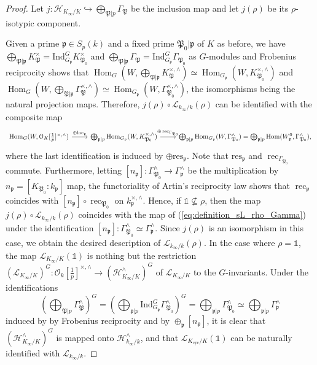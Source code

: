 \documentclass[12pt]{amsart}
\newcommand\cH{\mathcal{H}}
\newcommand\cO{\mathcal{O}}
\newcommand\gp{\mathfrak{p}}
\newcommand\gP{\mathfrak{P}}
\newcommand\sL{\mathscr{L}}
\newcommand{\loc}{\mathrm{loc}}
\newcommand{\Ind}{\mathrm{Ind}}
\newcommand{\res}{\mathrm{res}}
\DeclareMathOperator{\Hom}{Hom}
\DeclareMathOperator{\rec}{rec}
\newcommand{\cyc}{\textrm{cyc}}
\theoremstyle{defstyle}
\theoremstyle{thmstyle}
\begin{document}
	\begin{proof}
		Let $j \colon \cH_{K_\infty/K} \hookrightarrow \bigoplus_{\gP|p} \Gamma_\gP$ be the inclusion map and let $j(\rho)$ be its $\rho$-isotypic component. 
		
		Given a prime $\gp\in S_p(k)$ and a fixed prime $\gP_0|\gp$ of $K$ as before, we have $\bigoplus_{\gP|\gp} K_{\gP}^\times = \Ind_{G_\gp}^G K_{\gP_0}^\times$ and $\bigoplus_{\gP|\gp} \Gamma_\gP = \Ind_{G_\gp}^G \Gamma_{\gP_0}$ as $G$-modules and Frobenius reciprocity shows that $\Hom_G(W,\bigoplus_{\gP|\gp} K_\gP^{\times,\wedge})\simeq\Hom_{G_\gp}(W,K_{\gP_0}^{\times,\wedge})$ and $\Hom_G(W,\bigoplus_{\gP|\gp} \Gamma_\gP^{\times,\wedge})\simeq\Hom_{G_\gp}(W,\Gamma_{\gP_0}^{\times,\wedge})$, the isomorphisms being the natural projection maps. Therefore, $j(\rho)\circ \sL_{k_\infty/k}(\rho)$ can be identified with the composite map 
		\small$$\begin{tikzcd}
			\Hom_G(W,\cO_K[\tfrac{1}{p}]^{\times,\wedge})  \ar[r,"\oplus \loc_{\gp}"] & \bigoplus_{\gp|p} \Hom_{G_\gp}(W, K_{\gP_0}^{\times,\wedge}) \ar[r,"\oplus \rec_{\Gamma_{\gP_0}}"] & \bigoplus_{\gp|p} \Hom_{G_\gp}(W,\Gamma_{\gP_0}^\wedge)=\bigoplus_{\gp|p} \Hom(W_{\gp}^0,\Gamma_{\gP_0}^\wedge),
		\end{tikzcd}$$\normalsize
		where the last identification is induced by $\oplus \res_\gp$. Note that $\res_\gp$ and $\rec_{\Gamma_{\gP_0}}$ commute. Furthermore, letting $[n_\gp]:\Gamma_{\gP_0}^{\wedge} \rightarrow \Gamma_{\gp}^{\wedge}$ be the multiplication by $n_\gp=[K_{\gP_0}:k_\gp]$ map, the functoriality of Artin's reciprocity law shows that $\rec_{\gp}$ coincides with $[n_\gp]\circ \rec_{\gP_0}$ on $k_{\gp}^{\times,\wedge}$. Hence, if $\mathds{1} \not\subseteq \rho$, then the map $j(\rho) \circ\sL_{k_\infty/k}(\rho)$ coincides with the map of (\ref{eq:definition_sL_rho_Gamma}) under the identification $[n_\gp]:\Gamma_{\gP_0}^{\wedge} \simeq \Gamma_{\gp}^{\wedge}$. Since $j(\rho)$ is an isomorphism in this case, we obtain the desired description of $\sL_{k_\infty/k}(\rho)$. In the case where $\rho=\mathds{1}$, the map $\sL_{K_\infty/K}(\mathds{1})$ is nothing but the restriction  $(\sL_{K_\infty/K})^G \colon \cO_k[\tfrac{1}{p}]^{\times,\wedge} \to (\cH_{K_\infty/K}^\wedge)^G$ of $\sL_{K_\infty/K}$ to the $G$-invariants. Under the identifications
		$$(\bigoplus_{\gP|p} \Gamma_\gP^\wedge)^G = (\bigoplus_{\gp|p}\Ind_{G_\gp}^G \Gamma_{\gP_0}^\wedge )^G = \bigoplus_{\gp|p} \Gamma_{\gP_0}^\wedge \simeq \bigoplus_{\gp|p} \Gamma_\gp^\wedge$$ 
		induced by by Frobenius reciprocity and by $\oplus_\gp [n_\gp]$, it is clear that $(\cH_{K_\infty/K}^\wedge)^G$ is mapped onto $\cH_{k_\infty/k}^\wedge$, and that $\sL_{K_{\cyc}/K}(\mathds{1})$ can be  naturally identified with $\sL_{k_\infty/k}$.
		
	\end{proof}
\end{document}

